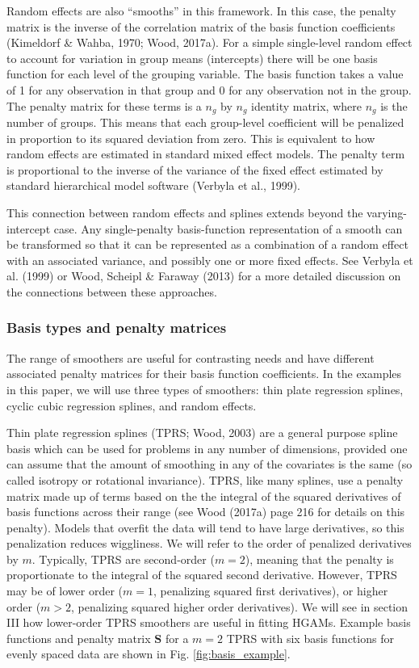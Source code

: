 \documentclass[12pt]{article}
\begin{document}
Random effects are also ``smooths'' in this framework. In this case, the
penalty matrix is the inverse of the correlation matrix of the basis
function coefficients (Kimeldorf \& Wahba, 1970; Wood, 2017a). For a
simple single-level random effect to account for variation in group
means (intercepts) there will be one basis function for each level of
the grouping variable. The basis function takes a value of 1 for any
observation in that group and 0 for any observation not in the group.
The penalty matrix for these terms is a \(n_g\) by \(n_g\) identity
matrix, where \(n_g\) is the number of groups. This means that each
group-level coefficient will be penalized in proportion to its squared
deviation from zero. This is equivalent to how random effects are
estimated in standard mixed effect models. The penalty term is
proportional to the inverse of the variance of the fixed effect
estimated by standard hierarchical model software (Verbyla et al.,
1999).

This connection between random effects and splines extends beyond the
varying-intercept case. Any single-penalty basis-function representation
of a smooth can be transformed so that it can be represented as a
combination of a random effect with an associated variance, and possibly
one or more fixed effects. See Verbyla et al. (1999) or Wood, Scheipl \&
Faraway (2013) for a more detailed discussion on the connections between
these approaches.

\subsubsection{Basis types and penalty
matrices}\label{basis-types-and-penalty-matrices}

The range of smoothers are useful for contrasting needs and have
different associated penalty matrices for their basis function
coefficients. In the examples in this paper, we will use three types of
smoothers: thin plate regression splines, cyclic cubic regression
splines, and random effects.

Thin plate regression splines (TPRS; Wood, 2003) are a general purpose
spline basis which can be used for problems in any number of dimensions,
provided one can assume that the amount of smoothing in any of the
covariates is the same (so called isotropy or rotational invariance).
TPRS, like many splines, use a penalty matrix made up of terms based on
the the integral of the squared derivatives of basis functions across
their range (see Wood (2017a) page 216 for details on this penalty).
Models that overfit the data will tend to have large derivatives, so
this penalization reduces wiggliness. We will refer to the order of
penalized derivatives by \(m\). Typically, TPRS are second-order
(\(m=2\)), meaning that the penalty is proportionate to the integral of
the squared second derivative. However, TPRS may be of lower order
(\(m=1\), penalizing squared first derivatives), or higher order
(\(m > 2\), penalizing squared higher order derivatives). We will see in
section III how lower-order TPRS smoothers are useful in fitting HGAMs.
Example basis functions and penalty matrix \(\mathbf{S}\) for a \(m=2\)
TPRS with six basis functions for evenly spaced data are shown in Fig.
\ref{fig:basis_example}.
\end{document}

